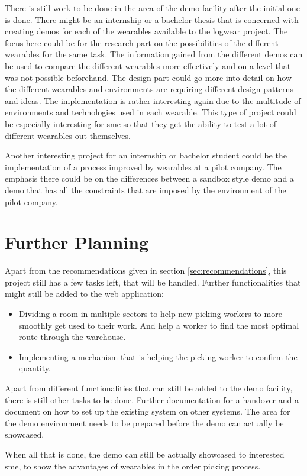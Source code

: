There is still work to be done in the area of the demo facility after the initial one is done. There might be an internship or a bachelor thesis that is concerned with creating demos for each of the wearables available to the logwear project. The focus here could be for the research part on the possibilities of the different wearables for the same task. The information gained from the different demos can be used to compare the different wearables more effectively and on a level that was not possible beforehand. The design part could go more into detail on how the different wearables and environments are requiring different design patterns and ideas. The implementation is rather interesting again due to the multitude of environments and technologies used in each wearable. This type of project could be especially interesting for \gls{sme} so that they get the ability to test a lot of different wearables out themselves.

Another interesting project for an internship or bachelor student could be the implementation of a process improved by wearables at a pilot company. The emphasis there could be on the differences between a sandbox style demo and a demo that has all the constraints that are imposed by the environment of the pilot company.


\section{Further Planning}
Apart from the recommendations given in section \ref{sec:recommendations}, this project still has a few tasks left, that will be handled. Further functionalities that might still be added to the web application:

\begin{itemize}
	\item Dividing a room in multiple sectors to help new picking workers to more smoothly get used to their work. And help a worker to find the most optimal route through the warehouse.
	\item Implementing a mechanism that is helping the picking worker to confirm the quantity.
\end{itemize}

Apart from different functionalities that can still be added to the demo facility, there is still other tasks to be done. Further documentation for a handover and a document on how to set up the existing system on other systems. The area for the demo environment needs to be prepared before the demo can actually be showcased.

When all that is done, the demo can still be actually showcased to interested \gls{sme}, to show the advantages of wearables in the order picking process.
